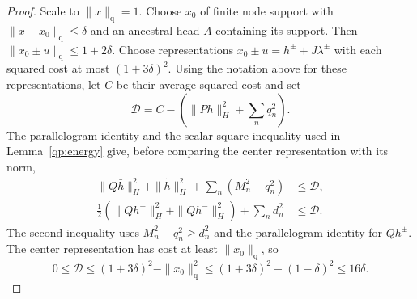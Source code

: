 \begin{proof}
Scale to $\|x\|_{\mathrm q}=1$.  Choose $x_0$ of finite node
support with $\|x-x_0\|_{\mathrm q}\le\delta$ and an ancestral
head $A$ containing its support.  Then
$\|x_0\pm u\|_{\mathrm q}\le1+2\delta$.  Choose representations
$x_0\pm u=h^\pm+J\lambda^\pm$ with each squared cost at most
$(1+3\delta)^2$.  Using the notation above for these representations,
let $C$ be their average squared cost and set
\[
\mathcal D=C-\left(\|P\bar h\|_H^2+\sum_nq_n^2\right).
\]
The parallelogram identity and the scalar square inequality used in
Lemma~\ref{qp:energy} give, before comparing the center representation
with its norm,
\[
 \begin{aligned}
 \|Q\bar h\|_H^2+\|\widetilde h\|_H^2+
       \sum_n(M_n^2-q_n^2)&\le\mathcal D,\\
 \tfrac12(\|Qh^+\|_H^2+\|Qh^-\|_H^2)+
       \sum_nd_n^2&\le\mathcal D.
 \end{aligned}
\]
The second inequality uses $M_n^2-q_n^2\ge d_n^2$ and the parallelogram
identity for $Qh^\pm$. The center representation has cost at least
$\|x_0\|_{\mathrm q}$, so
\begin{equation}\label{qp:seventytwo-energy}
 0\le\mathcal D\le(1+3\delta)^2-\|x_0\|_{\mathrm q}^2
 \le(1+3\delta)^2-(1-\delta)^2\le16\delta.
\end{equation}


\end{proof}
